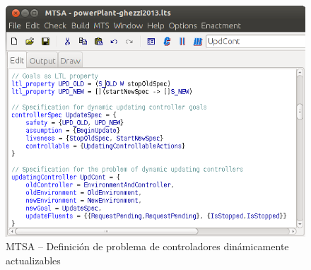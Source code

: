 \begin{figure}
    \centering
    \includegraphics[scale=0.5]{img/MTSA_example.png}
    \caption{MTSA -- Definición de problema de controladores dinámicamente actualizables}
    \label{MTSA_example}
\end{figure}


